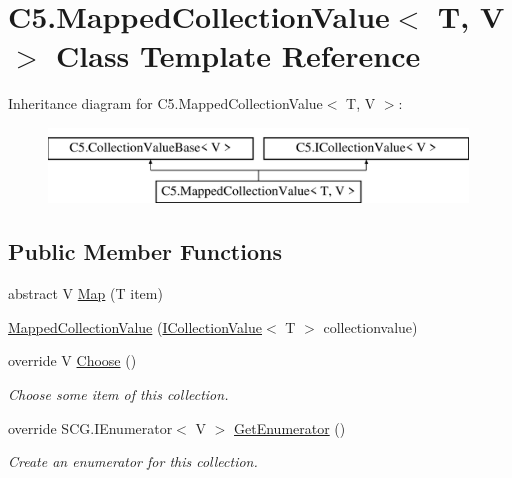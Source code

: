 \hypertarget{class_c5_1_1_mapped_collection_value}{}\section{C5.\+Mapped\+Collection\+Value$<$ T, V $>$ Class Template Reference}
\label{class_c5_1_1_mapped_collection_value}
Inheritance diagram for C5.\+Mapped\+Collection\+Value$<$ T, V $>$\+:\begin{figure}[H]
\begin{center}
\leavevmode
\includegraphics[height=2.000000cm]{class_c5_1_1_mapped_collection_value}
\end{center}
\end{figure}
\subsection*{Public Member Functions}
\begin{DoxyCompactItemize}
\item 
abstract V \hyperlink{class_c5_1_1_mapped_collection_value_aca2531c62aa5b01b7c099c6b7827beb2}{Map} (T item)
\item 
\hyperlink{class_c5_1_1_mapped_collection_value_ad55208e536ef6898ae97892bec5ff01b}{Mapped\+Collection\+Value} (\hyperlink{interface_c5_1_1_i_collection_value}{I\+Collection\+Value}$<$ T $>$ collectionvalue)
\item 
override V \hyperlink{class_c5_1_1_mapped_collection_value_a355a9906ff7acccd3c2bd40ca11e5d1f}{Choose} ()
\begin{DoxyCompactList}\small\item\em Choose some item of this collection. \end{DoxyCompactList}\item 
override S\+C\+G.\+I\+Enumerator$<$ V $>$ \hyperlink{class_c5_1_1_mapped_collection_value_ab4c51f484c9d5569b7f8c9f1bf4ab231}{Get\+Enumerator} ()
\begin{DoxyCompactList}\small\item\em Create an enumerator for this collection. \end{DoxyCompactList}\end{DoxyCompactItemize}
